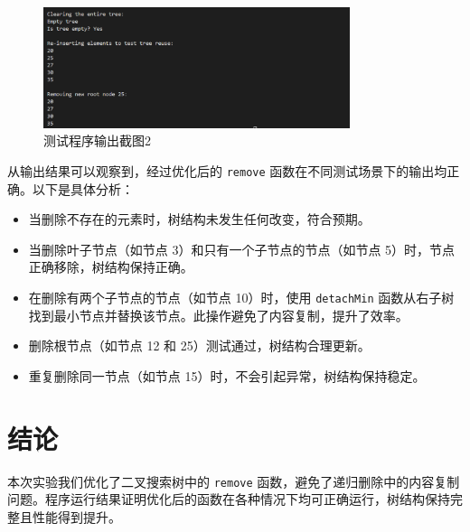 \documentclass[UTF8]{ctexart}
\begin{document}
\begin{figure}[H]
    \centering
    \includegraphics[width=0.8\textwidth]{实验结果1.png}
    \caption{测试程序输出截图2}
\end{figure}

从输出结果可以观察到，经过优化后的 \texttt{remove} 函数在不同测试场景下的输出均正确。以下是具体分析：

\begin{itemize}
    \item 当删除不存在的元素时，树结构未发生任何改变，符合预期。
    \item 当删除叶子节点（如节点 3）和只有一个子节点的节点（如节点 5）时，节点正确移除，树结构保持正确。
    \item 在删除有两个子节点的节点（如节点 10）时，使用 \texttt{detachMin} 函数从右子树找到最小节点并替换该节点。此操作避免了内容复制，提升了效率。
    \item 删除根节点（如节点 12 和 25）测试通过，树结构合理更新。
    \item 重复删除同一节点（如节点 15）时，不会引起异常，树结构保持稳定。
\end{itemize}

\section{结论}
本次实验我们优化了二叉搜索树中的 \texttt{remove} 函数，避免了递归删除中的内容复制问题。程序运行结果证明优化后的函数在各种情况下均可正确运行，树结构保持完整且性能得到提升。
\end{document}
